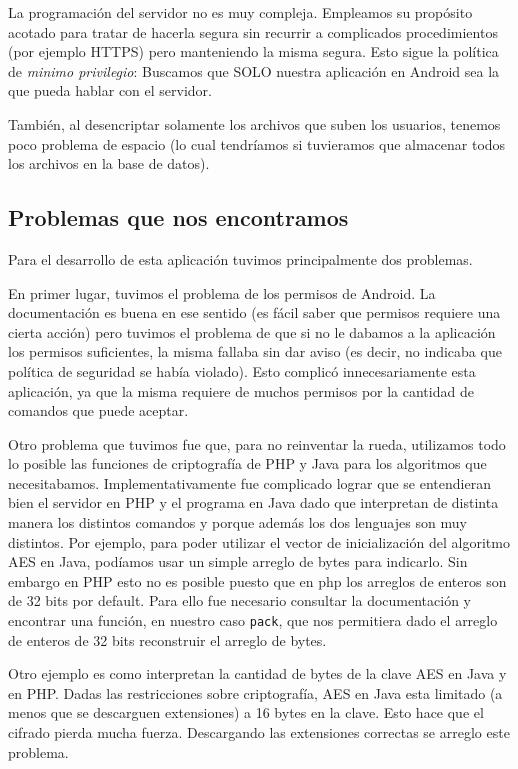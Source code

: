 La programación del servidor no es muy compleja. Empleamos su propósito acotado para tratar de hacerla segura sin recurrir a complicados
procedimientos (por ejemplo HTTPS) pero manteniendo la misma segura. Esto sigue la política de \textit{minimo privilegio}: Buscamos que SOLO
nuestra aplicación en Android sea la que pueda hablar con el servidor.

También, al desencriptar solamente los archivos que suben los usuarios, tenemos poco problema
de espacio (lo cual tendríamos si tuvieramos que almacenar todos los archivos en la base de
datos).

\subsection{Problemas que nos encontramos}

Para el desarrollo de esta aplicación tuvimos principalmente dos problemas.

En primer lugar, tuvimos el problema de los permisos de Android. La
documentaci\'on es buena en ese sentido (es fácil saber que permisos requiere
una cierta acción) pero tuvimos el problema de que si no le dabamos a la
aplicación los permisos suficientes, la misma fallaba sin dar aviso (es
decir, no indicaba que política de seguridad se había violado). Esto
complicó innecesariamente esta aplicación, ya que la misma requiere de
muchos permisos por la cantidad de comandos que puede aceptar.

Otro problema que tuvimos fue que, para no reinventar la rueda, utilizamos
todo lo posible las funciones de criptografía de PHP y Java para los
algoritmos que necesitabamos. Implementativamente fue complicado lograr
que se entendieran bien el servidor en PHP y el programa en Java dado que
interpretan de distinta manera los distintos comandos y porque además los
dos lenguajes son muy distintos. Por ejemplo, para poder utilizar el vector
de inicialización del algoritmo AES en Java, podíamos usar un simple
arreglo de bytes para indicarlo. Sin embargo en PHP esto no es posible
puesto que en php los arreglos de enteros son de 32 bits por default. Para
ello fue necesario consultar la documentaci\'on y encontrar una función,
en nuestro caso \texttt{pack}, que nos permitiera dado el arreglo de enteros
de 32 bits reconstruir el arreglo de bytes.

Otro ejemplo es como interpretan la cantidad de bytes de la clave AES en
Java y en PHP. Dadas las restricciones sobre criptografía, AES en Java
esta limitado (a menos que se descarguen extensiones) a 16 bytes en la clave.
Esto hace que el cifrado pierda mucha fuerza. Descargando las extensiones
correctas se arreglo este problema.

